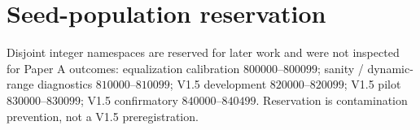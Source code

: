 \documentclass{article}
\begin{document}
\section{Seed-population reservation}
Disjoint integer namespaces are reserved for later work and were not inspected for Paper A outcomes:
equalization calibration $800000$--$800099$;
sanity / dynamic-range diagnostics $810000$--$810099$;
V1.5 development $820000$--$820099$;
V1.5 pilot $830000$--$830099$;
V1.5 confirmatory $840000$--$840499$.
Reservation is contamination prevention, not a V1.5 preregistration.
\end{document}
